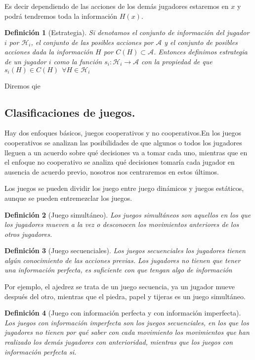 \documentclass[a4paper]{report} %
\newtheorem{definicion}{Definición}[section]
\begin{document}
 Es decir dependiendo de las acciones de los demás jugadores estaremos en  $x$ y podrá tendremos toda la información $H(x)$. 

\begin{definicion}[Estrategia]
Si denotamos el conjunto de información del jugador $i$ por $\mathcal{H}_i$, el conjunto de las posibles acciones por $\mathcal{A} $ y el conjunto de posibles acciones dada la información $H$ por $ C(H) \subset \mathcal{A} $. Entonces definimos estrategia de un jugador $i$ como la función $s_i:\mathcal{H}_i\longrightarrow \mathcal{A}$ con la propiedad de que $s_i(H) \in C(H)~~ \forall H \in \mathcal{H}_i $
\end{definicion}

Diremos qie 

\subsection{Clasificaciones de juegos.}

Hay dos enfoques básicos, juegos cooperativos y no cooperativos.En los juegos cooperativos se analizan las posibilidades de que algunos o todos los jugadores lleguen a un acuerdo sobre qué decisiones va a tomar cada uno, mientras que en el enfoque no cooperativo se analiza qué decisiones tomaría cada jugador en ausencia de acuerdo previo, nosotros nos centraremos en estos últimos.

Los juegos se pueden dividir los juego entre juego dinámicos y juegos estáticos, aunque se pueden entremezclar los juegos.

\begin{definicion}[Juego simultáneo]
Los juegos simultáneos son aquellos en los que los jugadores 
mueven a la vez o desconocen los movimientos anteriores de los 
otros jugadores. 
\end{definicion}


\begin{definicion}[Juego secuenciales]
Los juegos secuenciales los jugadores tienen algún 
conocimiento de las acciones previas. Los jugadores no tienen que 
tener una información perfecta, es suficiente con que tengan algo 
de información
\end{definicion}

Por ejemplo, el ajedrez se trata de un juego secuencia, ya un jugador mueve después del otro, mientras que el piedra, papel y tijeras es un juego simultáneo.


\begin{definicion}[Juego con información perfecta y con información imperfecta]
Los juegos con información imperfecta son los juegos secuenciales, en los que los jugadores no tienen por qué saber  con cada movimiento los movimientos que han realizado los demás jugadores con anterioridad, mientras que los juegos con información perfecta si.
\end{definicion}
\end{document}
